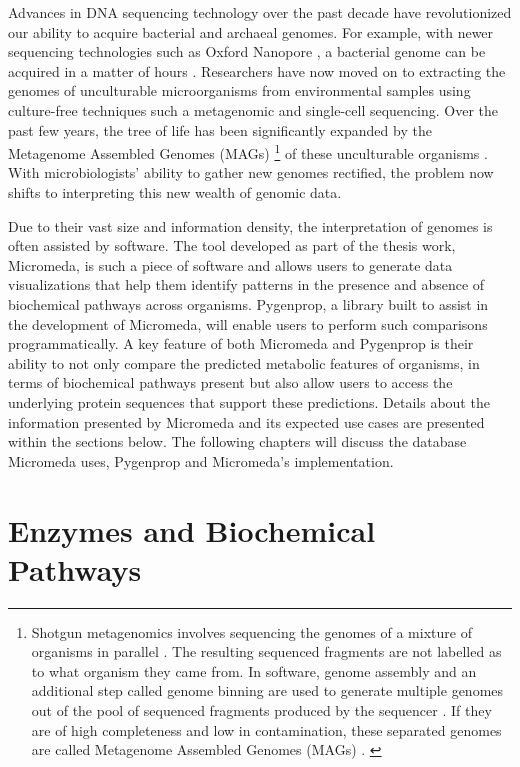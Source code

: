 Advances in DNA sequencing technology over the past decade have revolutionized our ability to acquire bacterial and archaeal genomes. For example, with newer sequencing technologies such as Oxford Nanopore \cite{jain2016oxford}, a bacterial genome can be acquired in a matter of hours \cite{Lu2016,Cao2017}. Researchers have now moved on to extracting the genomes of unculturable microorganisms from environmental samples using culture-free techniques such a metagenomic \cite{quince2017shotgun} and single-cell \cite{gawad2016single} sequencing. Over the past few years, the tree of life has been significantly expanded by the Metagenome Assembled Genomes (MAGs) \footnote{Shotgun metagenomics involves sequencing the genomes of a mixture of organisms in parallel \cite{quince2017shotgun}. The resulting sequenced fragments are not labelled as to what organism they came from. In software, genome assembly and an additional step called genome binning are used to generate multiple genomes out of the pool of sequenced fragments produced by the sequencer \cite{quince2017shotgun, sangwan2016recovering}. If they are of high completeness and low in contamination, these separated genomes are called Metagenome Assembled Genomes (MAGs)  \cite{sangwan2016recovering}. \label{metagenomics-footnote}} of these unculturable organisms \cite{Hug2016,Parks2017}. With microbiologists' ability to gather new genomes rectified, the problem now shifts to interpreting this new wealth of genomic data.

Due to their vast size and information density, the interpretation of genomes is often assisted by software. The tool developed as part of the thesis work, Micromeda, is such a piece of software and allows users to generate data visualizations that help them identify patterns in the presence and absence of biochemical pathways across organisms. Pygenprop, a library built to assist in the development of Micromeda, will enable users to perform such comparisons programmatically. A key feature of both Micromeda and Pygenprop is their ability to not only compare the predicted metabolic features of organisms, in terms of biochemical pathways present but also allow users to access the underlying protein sequences that support these predictions. Details about the information presented by Micromeda and its expected use cases are presented within the sections below. The following chapters will discuss the database Micromeda uses, Pygenprop and Micromeda's implementation.

\section{Enzymes and Biochemical Pathways} \label{enzymes-and-pathways} 

